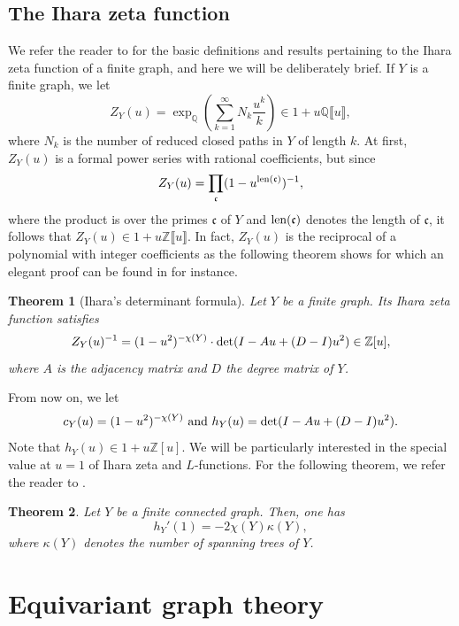 \documentclass[11pt]{amsart}
\newtheorem{theorem}{Theorem}[section]
\numberwithin{equation}{section}
\theoremstyle{remark}
\theoremstyle{definition}
\begin{document}
\subsection{The Ihara zeta function} \label{section:iha}
We refer the reader to \cite{Terras:2011} for the basic definitions and results pertaining to the Ihara zeta function of a finite graph, and here we will be deliberately brief.  If $Y$ is a finite graph, we let
$$Z_{Y}(u) = \exp_{\mathbb{Q}}\left(\sum_{k=1}^{\infty} N_{k} \frac{u^{k}}{k} \right) \in 1+ u\mathbb{Q}\llbracket u \rrbracket, $$
where $N_{k}$ is the number of reduced closed paths in $Y$ of length $k$.  At first, $Z_{Y}(u)$ is a formal power series with rational coefficients, but since
$$Z_{Y}(u) = \prod_{\mathfrak{c}}(1-u^{{\rm len}(\mathfrak{c})})^{-1},$$
where the product is over the primes $\mathfrak{c}$ of $Y$ and ${\rm len}(\mathfrak{c})$ denotes the length of $\mathfrak{c}$, it follows that $Z_{Y}(u) \in 1+ u\mathbb{Z}\llbracket u \rrbracket$.  In fact, $Z_{Y}(u)$ is the reciprocal of a polynomial with integer coefficients as the following theorem shows for which an elegant proof can be found in \cite{Kotani/Sunada:2000} for instance.
\begin{theorem}[Ihara's determinant formula] \label{ihara}
Let $Y$ be a finite graph.  Its Ihara zeta function satisfies
$$Z_{Y}(u)^{-1} = (1-u^{2})^{-\chi(Y)}\cdot {\rm det}(I - Au + (D - I)u^{2}) \in \mathbb{Z}[u], $$
where $A$ is the adjacency matrix and $D$ the degree matrix of $Y$.
\end{theorem}
From now on, we let
$$c_{Y}(u) = (1-u^{2})^{-\chi(Y)} \text{ and } h_{Y}(u) = {\rm det}(I - Au + (D - I)u^{2}). $$
Note that $h_{Y}(u) \in 1+u\mathbb{Z}[u]$.  We will be particularly interested in the special value at $u=1$ of Ihara zeta and $L$-functions.  For the following theorem, we refer the reader to \cite{Hashimoto:1990}.
\begin{theorem} \label{hashimoto}
Let $Y$ be a finite connected graph.  Then, one has
$$h_{Y}'(1) = -2 \chi(Y) \kappa(Y), $$
where $\kappa(Y)$ denotes the number of spanning trees of $Y$.
\end{theorem}


\section{Equivariant graph theory} \label{equ}
\end{document}
